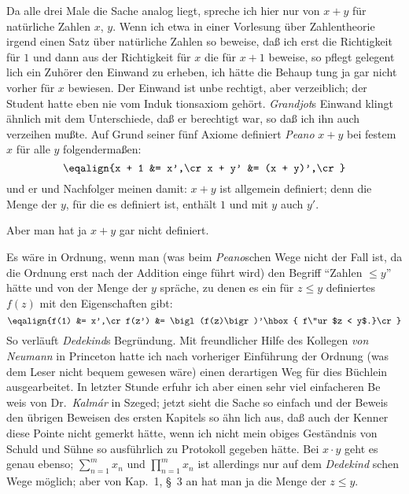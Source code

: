 Da alle drei Male die Sache analog liegt, spreche ich hier
nur von $x + y$ f\"ur nat\"urliche Zahlen $x$, $y$.  Wenn ich etwa in einer
Vorlesung \"uber Zahlentheorie irgend einen Satz \"uber nat\"urliche
Zahlen so beweise, da{\ss} ich erst die Richtigkeit f\"ur $1$ und dann
aus der Richtigkeit f\"ur $x$ die f\"ur $x + 1$ beweise, so pflegt gelegent%
lich ein Zuh\"orer den Einwand zu erheben, ich h\"atte die Behaup%
tung ja gar nicht vorher f\"ur $x$ bewiesen.  Der Einwand ist unbe%
rechtigt, aber verzeiblich; der Student hatte eben nie vom Induk%
tionsaxiom geh\"ort.  {\sl Grandjot\/}s Einwand klingt \"ahnlich mit dem
Unterschiede, da{\ss} er berechtigt war, so da{\ss} ich ihn auch verzeihen
mu{\ss}te.  Auf Grund seiner f\"unf Axiome definiert {\sl Peano\/} $x + y$ bei
festem $x$ f\"ur alle $y$ folgenderma{\ss}en:
$$\eqalign{x + 1 &= x',\cr
x + y' &= (x + y)',\cr}$$
und er und Nachfolger meinen damit: $x + y$ ist allgemein definiert;
denn die Menge der $y$, f\"ur die es definiert ist, enth\"alt $1$ und mit
$y$ auch $y'$.

Aber man hat ja $x + y$ gar nicht definiert.

Es w\"are in Ordnung, wenn man (was beim {\sl Peano\/}schen Wege
nicht der Fall ist, da die Ordnung erst nach der Addition einge%
f\"uhrt wird) den Begriff ``Zahlen $\le y$'' h\"atte und von der Menge
der $y$ spr\"ache, zu denen es ein f\"ur $z \le y$ definiertes $f(z)$ mit den
Eigenschaften gibt:
$$\eqalign{f(1) &= x',\cr
f(z') &= \bigl(f(z)\bigr)'\hbox{ f\"ur $z < y$.}\cr}$$
So verl\"auft {\sl Dedekind\/}s Begr\"undung.  Mit freundlicher Hilfe des
Kollegen {\sl von Neumann\/} in Princeton hatte ich nach vorheriger
Einf\"uhrung der Ordnung (was dem Leser nicht bequem gewesen
w\"are) einen derartigen Weg f\"ur dies B\"uchlein ausgearbeitet.
In letzter Stunde erfuhr ich aber einen sehr viel einfacheren Be%
weis von Dr.~{\sl Kalm\'ar\/} in Szeged; jetzt sieht die Sache so einfach
und der Beweis den \"ubrigen Beweisen des ersten Kapitels so \"ahn%
lich aus, da{\ss} auch der Kenner diese Pointe nicht gemerkt h\"atte,
wenn ich nicht mein obiges Gest\"andnis von Schuld und S\"uhne so
ausf\"uhrlich zu Protokoll gegeben h\"atte.  Bei $x \cdot y$ geht es genau
ebenso; $\sum_{n = 1}^m x_n$ und $\prod_{n = 1}^m x_n$ ist allerdings nur auf dem {\sl Dedekind\/}%
schen Wege m\"oglich; aber von Kap.~1, {\S}~3 an hat man ja die Menge
der $z \le y$.

